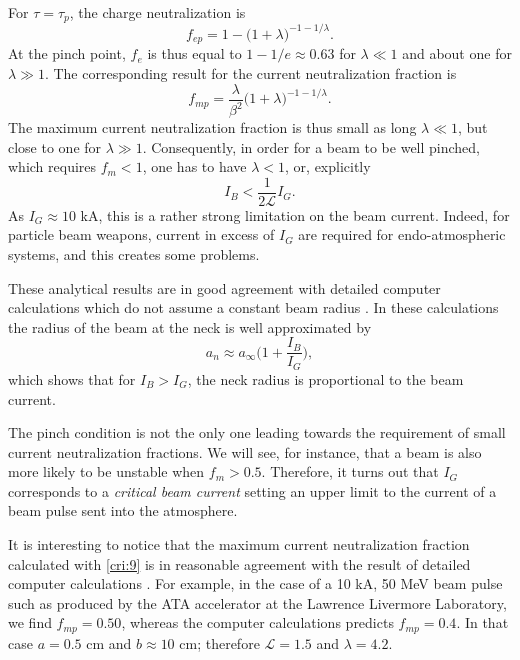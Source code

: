 \documentclass [12pt,a4paper,     ]{report} %
\begin{document}
	For $\tau=\tau_p$, the charge neutralization is
%
\begin{equation}\label{cri:8} %
    f_{ep} =   1 - \bigl(1+\lambda\bigr)^{-1-1/\lambda}.
\end{equation}
%
At the pinch point, $f_e$ is thus equal to $1-1/e \approx 0.63$ for $\lambda \ll 1$ and about one for $\lambda \gg 1$.  The corresponding result for the current neutralization fraction is
%
\begin{equation}\label{cri:9} %
    f_{mp} = \frac{\lambda}{\beta^2}
             \bigl(1+\lambda\bigr)^{-1-1/\lambda}.
\end{equation}
%
The maximum current neutralization fraction is thus small as long $\lambda \ll 1$, but close to one for $\lambda \gg 1$.  Consequently, in order for a beam to be well pinched, which requires $f_m < 1$, one has to have $\lambda<1$, or, explicitly
%
\begin{equation}\label{cri:10} %
    I_B < \frac{1}{2\mathcal{L}} I_G.
\end{equation}
%
As $I_G \approx 10$ kA, this is a rather strong limitation on the beam current.  Indeed, for particle beam weapons, current in excess of $I_G$ are required for endo-atmospheric systems, and this creates some problems.

	These analytical results are in good agreement with detailed computer calculations which do not assume a constant beam radius \cite{SHARP1980-}.  In these calculations the radius of the beam at the neck is well approximated by
%
\begin{equation}\label{cri:11} %
   a_n \approx  a_\infty \bigl( 1 +  \frac{I_B}{I_G}  \bigr),
\end{equation}
%
which shows that for $I_B > I_G$, the neck radius is proportional to the beam current.

	The pinch condition is not the only one leading towards the requirement of small current neutralization fractions.  We will see, for instance, that a beam is also more likely to be unstable when $f_m > 0.5$.  Therefore, it turns out that $I_G$ corresponds to a \emph{critical beam current} setting an upper limit to the current of a beam pulse sent into the atmosphere.

	It is interesting to notice that the maximum current neutralization fraction calculated with \eqref{cri:9} is in reasonable agreement with the result of detailed computer calculations \cite{CHAMB1981-,SHARP1980-}.  For example, in the case of a 10 kA, 50 MeV beam pulse such as produced by the ATA accelerator at the Lawrence Livermore Laboratory, we find $f_{mp} = 0.50$, whereas the computer calculations \cite{CHAMB1981-} predicts $f_{mp} =0.4$.  In that case $a=0.5$ cm and $b \approx 10$ cm; therefore $\mathcal{L} = 1.5$ and $\lambda=4.2$.
\end{document}
